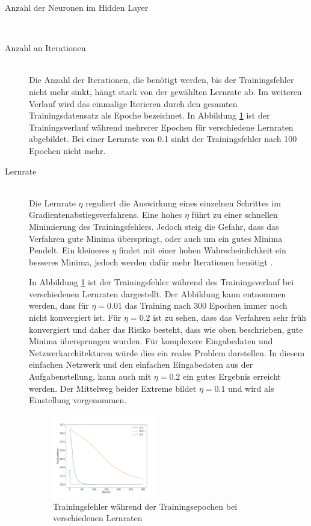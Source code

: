\begin{description}
	\item[Anzahl der Neuronen im Hidden Layer]\hfill \\
	\item[Anzahl an Iterationen]\hfill \\
	Die Anzahl der Iterationen, die benötigt werden, bis der Trainingsfehler nicht mehr sinkt, hängt stark von der gewählten Lernrate ab. Im weiteren Verlauf wird das einmalige Iterieren durch den gesamten Trainingsdatensatz als Epoche bezeichnet. In Abbildung \ref*{fig:learning_rates} ist der Trainingsverlauf während mehrerer Epochen für verschiedene Lernraten abgebildet. Bei einer Lernrate von 0.1 sinkt der Trainingsfehler nach 100 Epochen nicht mehr.
	
	\item[Lernrate]\hfill \\
	Die Lernrate $\eta$ reguliert die Auswirkung eines einzelnen Schrittes im Gradientenabstiegsverfahrens. Eine hohes $\eta$ führt zu einer schnellen Minimierung des Trainingsfehlers. Jedoch steig die Gefahr, dass das Verfahren gute Minima überspringt, oder auch um ein gutes Minima Pendelt. Ein kleineres $\eta$ findet mit einer hohen Wahrscheinlichkeit ein besseres Minima, jedoch werden dafür mehr Iterationen benötigt \cite{neuronalenetze}.
	
	In Abbildung \ref*{fig:learning_rates} ist der Trainingsfehler während des Trainingsverlauf bei verschiedenen Lernraten dargestellt. Der Abbildung kann entnommen werden, dass für $\eta=0.01$ das Training nach 300 Epochen immer noch nicht konvergiert ist. Für $\eta=0.2$ ist zu sehen, dass das Verfahren sehr früh konvergiert und daher das Risiko besteht, dass wie oben beschrieben, gute Minima übersprungen wurden. Für komplexere Eingabedaten und Netzwerkarchitekturen würde dies ein reales Problem darstellen. In diesem einfachen Netzwerk und den einfachen Eingabedaten aus der Aufgabenstellung, kann auch mit $\eta=0.2$ ein gutes Ergebnis erreicht werden. Der Mittelweg beider Extreme bildet $\eta=0.1$ und wird als Einstellung vorgenommen.
	
	\begin{figure}[h]
		\centering
		\includegraphics[width = 0.45\textwidth]{Bilder/learning_rates.png}
		\caption{Trainingsfehler während der Trainingsepochen bei verschiedenen Lernraten}
		\label{fig:learning_rates}
	\end{figure}
	

\end{description}
